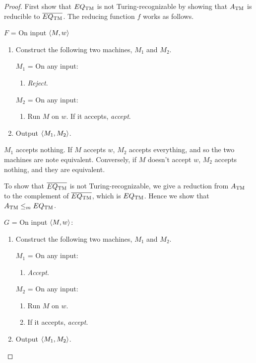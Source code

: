 \begin{mdframed}
\begin{proof}
First show that $EQ_{\text{TM}}$ is not Turing-recognizable by showing that $A_{\text{TM}}$ is reducible to $\overline{EQ_{\text{TM}}}$. The reducing function $f$ works as follows.

\medskip
$F$ = On input $\langle{M, w}\rangle$
\begin{enumerate}
\item Construct the following two machines, $M_1$ and $M_2$.

$M_1$ = On any input:
\begin{enumerate}
\item \textit{Reject}.
\end{enumerate}

$M_2$ = On any input:
\begin{enumerate}
\item Run $M$ on $w$. If it accepts, \textit{accept}.
\end{enumerate}

\item Output $\langle{M_1, M_2}\rangle$.
\end{enumerate}

$M_1$ accepts nothing. If $M$ accepts $w$, $M_2$ accepts everything, and so the two machines are note equivalent. Conversely, if $M$ doesn't accept $w$, $M_2$ accepts nothing, and they are equivalent.

\medskip
To show that $\overline{EQ_{\text{TM}}}$ is not Turing-recognizable, we give a reduction from $A_{\text{TM}}$ to the complement of $\overline{EQ_{\text{TM}}}$, which is $EQ_{\text{TM}}$. Hence we show that $A_{\text{TM}} \leq_m EQ_{\text{TM}}$.

\medskip
$G$ = On input $\langle{M, w}\rangle$:
\begin{enumerate}
\item Construct the following two machines, $M_1$ and $M_2$.

$M_1$ = On any input:
\begin{enumerate}
\item \textit{Accept}.
\end{enumerate}

$M_2$ = On any input:
\begin{enumerate}
\item Run $M$ on $w$.
\item If it accepts, \textit{accept}.
\end{enumerate}
\item Output $\langle{M_1, M_2}\rangle$.
\end{enumerate}
\end{proof}
\end{mdframed}

